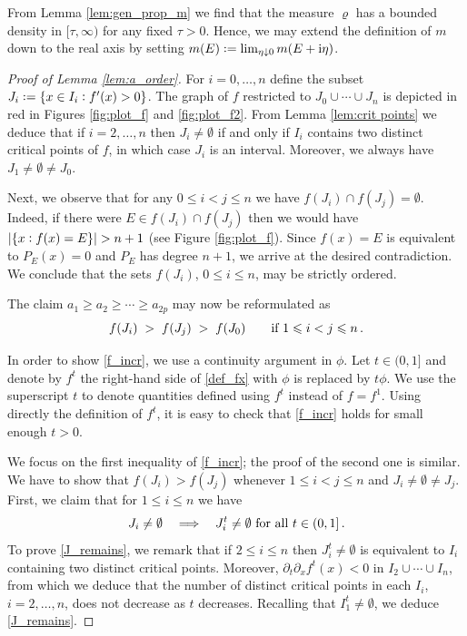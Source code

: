 \documentclass[11pt]{article} %
\numberwithin{equation}{section}
\numberwithin{figure}{section}
\theoremstyle{plain} %
\theoremstyle{definition} %
\newcommand{\txt}[1]{\text{\rm{#1}}}
\newcommand{\ii}{\mathrm{i}}
\newcommand{\col}{\mathrel{\vcenter{\baselineskip0.75ex \lineskiplimit0pt \hbox{.}\hbox{.}}}}
\newcommand*{\deq}{\mathrel{\vcenter{\baselineskip0.65ex \lineskiplimit0pt \hbox{.}\hbox{.}}}=}
\renewcommand{\leq}{\leqslant}
\renewcommand{\geq}{\geqslant}
\newcommand{\h}[1]{\{{#1}\}}
\newcommand{\abs}[1]{\lvert #1 \rvert}
\begin{document}
From Lemma \ref{lem:gen_prop_m} we find that the measure $\varrho$ has a bounded density in $[\tau,\infty)$ for any fixed $\tau > 0$. Hence, we may extend the definition of $m$ down to the real axis by setting $m(E) \deq \lim_{\eta \downarrow 0} m(E + \ii \eta)$. 




\begin{proof}[Proof of Lemma \ref{lem:a_order}]
For $i = 0, \dots, n$ define the subset $J_i \deq \h{x \in I_i \col f'(x) > 0}$. The graph of $f$ restricted to $J_0 \cup \cdots \cup J_n$ is depicted in red in Figures \ref{fig:plot_f} and \ref{fig:plot_f2}. From Lemma \ref{lem:crit points} we deduce that if $i = 2, \dots, n$ then $J_i \neq \emptyset$ if and only if $I_i$ contains two distinct critical points of $f$, in which case $J_i$ is an interval. Moreover, we always have $J_1 \neq \emptyset \neq J_0$.

Next, we observe that for any $0 \leq i < j \leq n$ we have $f(J_i) \cap f(J_j) = \emptyset$. Indeed, if there were $E \in f(J_i) \cap f(J_j)$ then we would have $\abs{\h{x \col f(x) = E}} > n+1$ (see Figure \ref{fig:plot_f}). Since $f(x) = E$ is equivalent to $P_E(x) = 0$ and $P_E$ has degree $n+1$, we arrive at the desired contradiction. We conclude that the sets $f(J_i)$, $0 \leq i \leq n$, may be strictly ordered.


The claim $a_1 \geq a_2 \geq \cdots \geq a_{2p}$ may now be reformulated as
\begin{equation} \label{f_incr}
f(J_i) \;>\; f(J_j) \;>\; f(J_0) \qquad \txt{if } 1 \leq i < j \leq n\,.
\end{equation}

In order to show \eqref{f_incr}, we use a continuity argument in $\phi$. Let $t \in (0,1]$ and denote by $f^t$ the right-hand side of \eqref{def_fx} with $\phi$ is replaced by $t \phi$. We use the superscript $t$ to denote quantities defined using $f^t$ instead of $f = f^1$. Using directly the definition of $f^t$, it is easy to check that \eqref{f_incr} holds for small enough $t > 0$.


We focus on the first inequality of \eqref{f_incr}; the proof of the second one is similar. We have to show that $f(J_i) > f(J_j)$ whenever $1 \leq i < j \leq n$ and $J_i \neq \emptyset \neq J_j$. First, we claim that for $1 \leq i \leq n$ we have
\begin{equation} \label{J_remains}
J_i \neq \emptyset \quad \Longrightarrow \quad J_i^t \neq \emptyset \txt{ for all } t \in (0,1]\,.
\end{equation}
To prove \eqref{J_remains}, we remark that if $2 \leq i \leq n$ then $J_i^t \neq \emptyset$ is equivalent to $I_i$ containing two distinct critical points. Moreover, $\partial_t \partial_x f^t(x) < 0$ in $I_2 \cup \cdots \cup I_n$, from which we deduce that the number of distinct critical points in each $I_i$, $i = 2, \dots, n$, does not decrease as $t$ decreases. Recalling that $I_1^t \neq \emptyset$, we deduce \eqref{J_remains}.


\end{proof}
\end{document}
